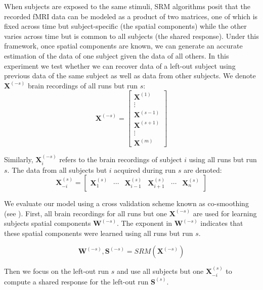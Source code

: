 \documentclass{report}
\begin{document}
{When subjects are exposed to the same stimuli, SRM algorithms posit that the recorded fMRI data can be modeled as a product of two matrices, one of which is fixed across time but subject-specific (the spatial components) while the other varies across time but is common to all subjects (the shared response).
%
Under this framework, once spatial components are known, we can generate an accurate estimation of the data of one subject given the data of all others.
%
In this experiment we test whether we can recover data of a left-out subject using previous data of the same subject as well as data from other subjects. 
We denote $\mathbf{X}^{(-s)}$ brain recordings of all runs but run $s$:
 \begin{equation*}
	 \mathbf{X}^{(-s)} = 
\begin{bmatrix}
	\mathbf{X}^{(1)} \\
	\vdots \\
	\mathbf{X}^{(s-1)} \\
	\mathbf{X}^{(s+1)} \\
	\vdots \\
	\mathbf{X}^{(m)}
\end{bmatrix}
\end{equation*}

Similarly, $\mathbf{X}_i^{(-s)}$ refers to the brain recordings of subject $i$ using all runs but run $s$. The data from all subjects but $i$ acquired during run $s$ are denoted:
\begin{equation*}
	\mathbf{X}^{(s)}_{-i} = 
\begin{bmatrix}
	\mathbf{X}_1^{(s)} & \cdots & \mathbf{X}^{(s)}_{i-1} & \mathbf{X}^{(s)}_{i+1} & \cdots & \mathbf{X}^{(s)}_{n} 
\end{bmatrix}
\end{equation*}

We evaluate our model using a cross validation scheme known as co-smoothing (see \cite{wu2018learning}). First, all brain recordings for all runs but one $\mathbf{X}^{(-s)}$ are used for learning subjects spatial components $\mathbf{W}^{(-s)}$. The exponent in $\mathbf{W}^{(-s)}$ indicates that these spatial components were learned using all runs but run $s$. 

\begin{equation*}
	\mathbf{W}^{(-s)}, \mathbf{S}^{(-s)} = SRM(\mathbf{X}^{(-s)})
\end{equation*}

Then we focus on the left-out run $s$ and use all subjects but one $\mathbf{X}^{(s)}_{-i}$ to compute a shared response for the left-out run $\mathbf{S}^{(s)}$.

}
\end{document}
